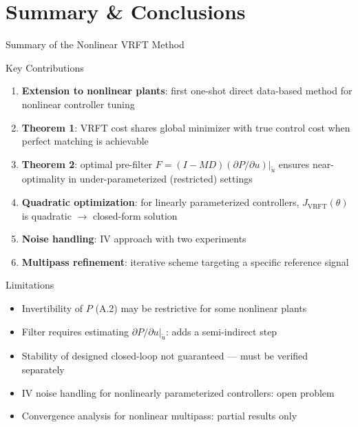 \documentclass[hyperref={pdfpagemode=FullScreen},aspectratio=169]{beamer}
\newcommand{\JJ}{J_{\mathrm{VRFT}}}
\begin{document}
\section{Summary \& Conclusions}

\begin{frame}{Summary of the Nonlinear VRFT Method}
      \begin{exampleblock}{Key Contributions}
        \begin{enumerate}
          \setlength{\itemsep}{0.35em}
          \item \textbf{Extension to nonlinear plants}: first one-shot direct data-based method for nonlinear controller tuning
          \item \textbf{Theorem 1}: VRFT cost shares global minimizer with true control cost when perfect matching is achievable
          \item \textbf{Theorem 2}: optimal pre-filter $F=(I-MD)(\partial P/\partial u)|_{\tilde{u}}$ ensures near-optimality in under-parameterized (restricted) settings
          \item \textbf{Quadratic optimization}: for linearly parameterized controllers, $\JJ(\theta)$ is quadratic $\to$ closed-form solution
          \item \textbf{Noise handling}: IV approach with two experiments
          \item \textbf{Multipass refinement}: iterative scheme targeting a specific reference signal
        \end{enumerate}
      \end{exampleblock}
\end{frame}
\begin{frame}
      \begin{alertblock}{Limitations}
        \begin{itemize}
          \item Invertibility of $P$ (A.2) may be restrictive for some nonlinear plants
          \item Filter requires estimating $\partial P/\partial u|_{\tilde{u}}$: adds a semi-indirect step
          \item Stability of designed closed-loop not guaranteed --- must be verified separately
          \item IV noise handling for nonlinearly parameterized controllers: open problem
          \item Convergence analysis for nonlinear multipass: partial results only
        \end{itemize}
      \end{alertblock}
\end{frame}
\end{document}
